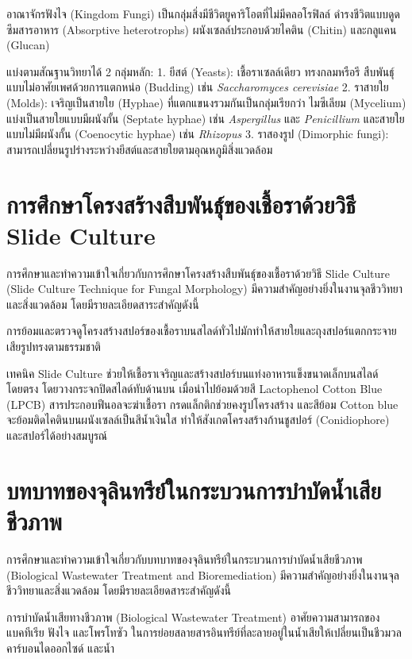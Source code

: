 อาณาจักรฟังไจ (Kingdom Fungi) เป็นกลุ่มสิ่งมีชีวิตยูคาริโอตที่ไม่มีคลอโรฟิลล์ ดำรงชีวิตแบบดูดซึมสารอาหาร (Absorptive heterotrophs) ผนังเซลล์ประกอบด้วยไคติน (Chitin) และกลูแคน (Glucan)

แบ่งตามสัณฐานวิทยาได้ 2 กลุ่มหลัก:
1. ยีสต์ (Yeasts): เชื้อราเซลล์เดียว ทรงกลมหรือรี สืบพันธุ์แบบไม่อาศัยเพศด้วยการแตกหน่อ (Budding) เช่น \textit{Saccharomyces cerevisiae}
2. ราสายใย (Molds): เจริญเป็นสายใย (Hyphae) ที่แตกแขนงรวมกันเป็นกลุ่มเรียกว่า ไมซีเลียม (Mycelium) แบ่งเป็นสายใยแบบมีผนังกั้น (Septate hyphae) เช่น \textit{Aspergillus} และ \textit{Penicillium} และสายใยแบบไม่มีผนังกั้น (Coenocytic hyphae) เช่น \textit{Rhizopus}
3. ราสองรูป (Dimorphic fungi): สามารถเปลี่ยนรูปร่างระหว่างยีสต์และสายใยตามอุณหภูมิสิ่งแวดล้อม

\section{การศึกษาโครงสร้างสืบพันธุ์ของเชื้อราด้วยวิธี Slide Culture}

การศึกษาและทำความเข้าใจเกี่ยวกับการศึกษาโครงสร้างสืบพันธุ์ของเชื้อราด้วยวิธี Slide Culture (Slide Culture Technique for Fungal Morphology) มีความสำคัญอย่างยิ่งในงานจุลชีววิทยาและสิ่งแวดล้อม โดยมีรายละเอียดสาระสำคัญดังนี้

การย้อมและตรวจดูโครงสร้างสปอร์ของเชื้อราบนสไลด์ทั่วไปมักทำให้สายใยและถุงสปอร์แตกกระจาย เสียรูปทรงตามธรรมชาติ

เทคนิค Slide Culture ช่วยให้เชื้อราเจริญและสร้างสปอร์บนแท่งอาหารแข็งขนาดเล็กบนสไลด์โดยตรง โดยวางกระจกปิดสไลด์ทับด้านบน เมื่อนำไปย้อมด้วยสี Lactophenol Cotton Blue (LPCB) สารประกอบฟีนอลจะฆ่าเชื้อรา กรดแล็กติกช่วยคงรูปโครงสร้าง และสีย้อม Cotton blue จะย้อมติดไคตินบนผนังเซลล์เป็นสีน้ำเงินใส ทำให้สังเกตโครงสร้างก้านชูสปอร์ (Conidiophore) และสปอร์ได้อย่างสมบูรณ์

\section{บทบาทของจุลินทรีย์ในกระบวนการบำบัดน้ำเสียชีวภาพ}

การศึกษาและทำความเข้าใจเกี่ยวกับบทบาทของจุลินทรีย์ในกระบวนการบำบัดน้ำเสียชีวภาพ (Biological Wastewater Treatment and Bioremediation) มีความสำคัญอย่างยิ่งในงานจุลชีววิทยาและสิ่งแวดล้อม โดยมีรายละเอียดสาระสำคัญดังนี้

การบำบัดน้ำเสียทางชีวภาพ (Biological Wastewater Treatment) อาศัยความสามารถของแบคทีเรีย ฟังไจ และโพรโทซัว ในการย่อยสลายสารอินทรีย์ที่ละลายอยู่ในน้ำเสียให้เปลี่ยนเป็นชีวมวล คาร์บอนไดออกไซด์ และน้ำ

